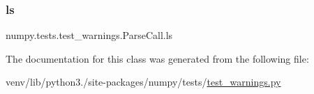 \subsubsection{\texorpdfstring{ls}{ls}}
{\footnotesize\ttfamily numpy.\+tests.\+test\+\_\+warnings.\+Parse\+Call.\+ls}



The documentation for this class was generated from the following file\+:\begin{DoxyCompactItemize}
\item 
venv/lib/python3./site-\/packages/numpy/tests/\hyperlink{test__warnings_8py}{test\+\_\+warnings.\+py}\end{DoxyCompactItemize}
